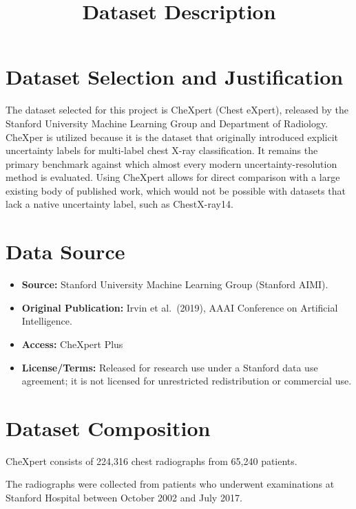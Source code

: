 \documentclass[conference]{IEEEtran}
\begin{document}
%
\title{Dataset Description}

\author{
}

\maketitle

\section{Dataset Selection and Justification}
The dataset selected for this project is CheXpert (Chest eXpert), released by the Stanford University Machine Learning Group and Department of Radiology. CheXper is utilized because it is the dataset that originally introduced explicit uncertainty labels for multi-label chest X-ray classification. It remains the primary benchmark against which almost every modern uncertainty-resolution method is evaluated. Using CheXpert allows for direct comparison with a large existing body of published work, which would not be possible with datasets that lack a native uncertainty label, such as ChestX-ray14.

\section{Data Source}
\begin{itemize}
\item \textbf{Source:} Stanford University Machine Learning Group (Stanford AIMI).
\item \textbf{Original Publication:} Irvin et al.\ (2019), AAAI Conference on Artificial Intelligence.
\item \textbf{Access:} CheXpert Plus
\item \textbf{License/Terms:} Released for research use under a Stanford data use agreement; it is not licensed for unrestricted redistribution or commercial use.
\end{itemize}

\section{Dataset Composition}
CheXpert consists of 224,316 chest radiographs from 65,240 patients.

The radiographs were collected from patients who underwent examinations at Stanford Hospital between October 2002 and July 2017.
\end{document}
